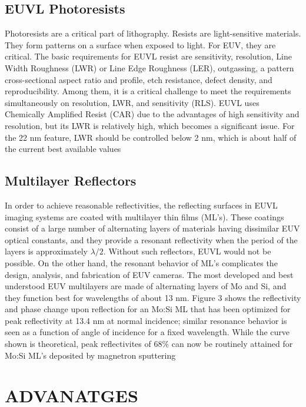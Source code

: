 \documentclass[12pt,a4paper]{report}
\begin{document}
\section{EUVL Photoresists}

Photoresists are a critical part of lithography. Resists are 
light-sensitive materials. 
They form patterns on a surface when exposed to light. For EUV, 
they are critical.
The basic requirements for EUVL resist are sensitivity, 
resolution, Line Width Roughness 
(LWR) or Line Edge Roughness (LER), outgassing, a pattern 
cross-sectional aspect ratio 
and profile, etch resistance, defect density, and 
reproducibility. Among them, 
it is a critical challenge to meet the requirements 
simultaneously on resolution, 
LWR, and sensitivity (RLS). EUVL uses Chemically Amplified 
Resist (CAR) due to 
the advantages of high sensitivity and resolution, but its 
LWR is relatively high, 
which becomes a significant issue. For the 22 nm feature, 
LWR should be 
controlled below 2 nm, which is about half of the current 
best available values
\section{Multilayer Reflectors}

In order to achieve reasonable reflectivities, the reflecting
surfaces in EUVL imaging systems are coated with
multilayer thin films (ML’s). These coatings consist of a
large number of alternating layers of materials having
dissimilar EUV optical constants, and they provide a
resonant reflectivity when the period of the layers is
approximately $\lambda/2$. Without such reflectors, EUVL
would not be possible. On the other hand, the resonant
behavior of ML’s complicates the design, analysis, and
fabrication of EUV cameras. The most developed and
best understood EUV multilayers are made of alternating
layers of Mo and Si, and they function best for
wavelengths of about 13 nm. Figure 3 shows the
reflectivity and phase change upon reflection for an
Mo:Si ML that has been optimized for peak reflectivity at
13.4 nm at normal incidence; similar resonance behavior
is seen as a function of angle of incidence for a fixed
wavelength. While the curve shown is theoretical, peak
reflectivites of 68\% can now be routinely attained for
Mo:Si ML’s deposited by magnetron sputtering

\chapter{ADVANATGES}
\end{document}
